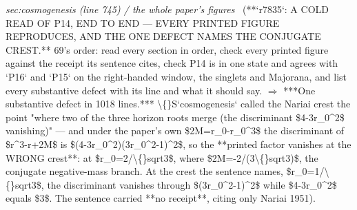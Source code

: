 \begin{description}
\textit{sec:cosmogenesis (line 745) / the whole paper's figures} \ (**`r7835`: A COLD READ OF P14, END TO END --- EVERY PRINTED FIGURE REPRODUCES, AND THE ONE DEFECT NAMES THE CONJUGATE CREST.** 69's order: read every section in order, check every printed figure against the receipt its sentence cites, check P14 is in one state and agrees with `P16` and `P15` on the right-handed window, the singlets and Majorana, and list every substantive defect with its line and what it should say. \ensuremath{\Rightarrow} ***One substantive defect in 1018 lines.*** \textbackslash\{\}S`cosmogenesis` called the Nariai crest the point "where two of the three horizon roots merge (the discriminant \$4-3r\_0\textasciicircum{}2\$ vanishing)" --- and under the paper's own \$2M=r\_0-r\_0\textasciicircum{}3\$ the discriminant of \$r\textasciicircum{}3-r+2M\$ is \$(4-3r\_0\textasciicircum{}2)(3r\_0\textasciicircum{}2-1)\textasciicircum{}2\$, so the **printed factor vanishes at the WRONG crest**: at \$r\_0=2/\textbackslash\{\}sqrt3\$, where \$2M=-2/(3\textbackslash\{\}sqrt3)\$, the conjugate negative-mass branch. At the crest the sentence names, \$r\_0=1/\textbackslash\{\}sqrt3\$, the discriminant vanishes through \$(3r\_0\textasciicircum{}2-1)\textasciicircum{}2\$ while \$4-3r\_0\textasciicircum{}2\$ equals \$3\$. The sentence carried **no receipt**, citing only Nariai 1951). 

\end{description}

